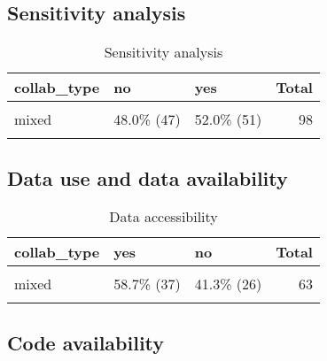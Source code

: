 \documentclass[
]{article}
\begin{document}
\hypertarget{sensitivity-analysis}{%
\subsection{Sensitivity analysis}\label{sensitivity-analysis}}

\begin{table}[H]

\caption{\label{tab:unnamed-chunk-38}Sensitivity analysis}
\centering
\begin{tabular}[t]{lllr}
\toprule
collab\_type & no & yes & Total\\
\midrule
\cellcolor{gray!6}{purely\_academic} & \cellcolor{gray!6}{58.1\%  (75)} & \cellcolor{gray!6}{41.9\%  (54)} & \cellcolor{gray!6}{129}\\
mixed & 48.0\%  (47) & 52.0\%  (51) & 98\\
\cellcolor{gray!6}{Total} & \cellcolor{gray!6}{53.7\% (122)} & \cellcolor{gray!6}{46.3\% (105)} & \cellcolor{gray!6}{227}\\
\bottomrule
\end{tabular}
\end{table}

\hypertarget{data-use-and-data-availability}{%
\subsection{Data use and data
availability}\label{data-use-and-data-availability}}

\begin{table}[H]

\caption{\label{tab:unnamed-chunk-39}Data accessibility}
\centering
\begin{tabular}[t]{lllr}
\toprule
collab\_type & yes & no & Total\\
\midrule
\cellcolor{gray!6}{purely\_academic} & \cellcolor{gray!6}{82.5\% (52)} & \cellcolor{gray!6}{17.5\% (11)} & \cellcolor{gray!6}{63}\\
mixed & 58.7\% (37) & 41.3\% (26) & 63\\
\cellcolor{gray!6}{Total} & \cellcolor{gray!6}{70.6\% (89)} & \cellcolor{gray!6}{29.4\% (37)} & \cellcolor{gray!6}{126}\\
\bottomrule
\end{tabular}
\end{table}

\hypertarget{code-availability}{%
\subsection{Code availability}\label{code-availability}}
\end{document}

